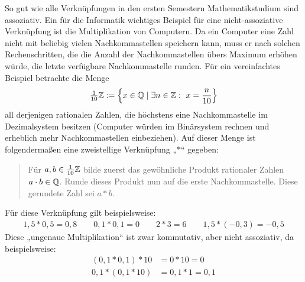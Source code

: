 \begin{bsp} \label{bsp:fehlerrech}
    So gut wie alle Verknüpfungen in den ersten Semestern Mathematikstudium sind assoziativ. Ein für die Informatik wichtiges Beispiel für eine nicht-assoziative Verknüpfung ist die Multiplikation von Computern. Da ein Computer eine Zahl nicht mit beliebig vielen Nachkommastellen speichern kann, muss er nach solchen Rechenschritten, die die Anzahl der Nachkommastellen übers Maximum erhöhen würde, die letzte verfügbare Nachkommastelle runden. Für ein vereinfachtes Beispiel betrachte die Menge
        \[ \tfrac{1}{10}\mathbb Z := \left\{ x\in \mathbb Q \mid \exists n\in \mathbb Z:\ x=\frac{n}{10} \right\} \]
    all derjenigen rationalen Zahlen, die höchstens eine Nachkommastelle im Dezimalsystem besitzen (Computer würden im Binärsystem rechnen und erheblich mehr Nachkommastellen einbeziehen). Auf dieser Menge ist folgendermaßen eine zweistellige Verknüpfung „$*$“ gegeben:
    \begin{quote}
        Für $a,b\in \frac{1}{10}\mathbb Z$ bilde zuerst das gewöhnliche Produkt rationaler Zahlen $a\cdot b \in \mathbb Q$. Runde dieses Produkt nun auf die erste Nachkommastelle. Diese gerundete Zahl sei $a*b$.
    \end{quote}
    Für diese Verknüpfung gilt beispielsweise:
    \begin{align*}
        1{,}5* 0{,}5 = 0{,}8 \qquad 0{,}1* 0{,}1 = 0 \qquad 2*3 = 6 \qquad 1{,}5 * (-0{,}3)= -0{,}5 
    \end{align*}
    Diese „ungenaue Multiplikation“ ist zwar kommutativ, aber nicht assoziativ, da beispielsweise:
    \begin{align*}
        (0{,}1 * 0{,}1) * 10 & = 0*10 = 0 \\
        0{,}1*(0{,}1*10) & = 0{,}1*1 = 0{,}1
    \end{align*}
\end{bsp}


